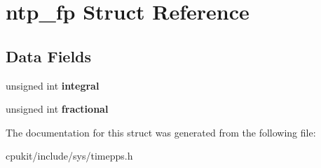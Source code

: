 \hypertarget{structntp__fp}{}\section{ntp\+\_\+fp Struct Reference}
\label{structntp__fp}
\subsection*{Data Fields}
\begin{DoxyCompactItemize}
\item 
\mbox{\label{structntp__fp_a871df9a99a070bfa6f1aed69ae2504ef}} 
unsigned int {\bfseries integral}
\item 
\mbox{\label{structntp__fp_a8466c05bb9dfd333da133aefcb3158b0}} 
unsigned int {\bfseries fractional}
\end{DoxyCompactItemize}


The documentation for this struct was generated from the following file\+:\begin{DoxyCompactItemize}
\item 
cpukit/include/sys/timepps.\+h\end{DoxyCompactItemize}

